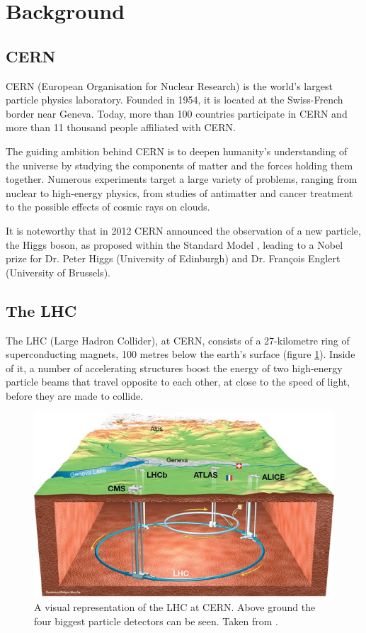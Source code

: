 \section{Background}
\subsection{CERN}
CERN (European Organisation for Nuclear Research) \cite{CERN_official} is the world's largest particle physics laboratory. Founded in 1954, it is located at the Swiss-French border near Geneva. Today, more than 100 countries participate in CERN and more than 11 thousand people affiliated with CERN.

The guiding ambition behind CERN is to deepen humanity's understanding of the universe by studying the components of matter and the forces holding them together. Numerous experiments target a large variety of problems, ranging from nuclear to high-energy physics, from studies of antimatter and cancer treatment to the possible effects of cosmic rays on clouds.

It is noteworthy that in 2012 CERN announced the observation of a new particle, the Higgs boson, as proposed within the Standard Model \cite{CERN_higgs}, leading to a Nobel prize for Dr. Peter Higgs (University of Edinburgh) and Dr. François Englert (University of Brussels). 

\subsection{The LHC}
The LHC (Large Hadron Collider), at CERN, consists of a 27-kilometre ring of superconducting magnets, 100 metres below the earth's surface (figure \ref{fig:LHC}). Inside of it, a number of accelerating structures boost the energy of two high-energy particle beams that travel opposite to each other, at close to the speed of light, before they are made to collide.  

\begin{figure}
    \centering
    \includegraphics[width=0.9\linewidth]{images/LHC.jpg}
        \caption{A visual representation of the LHC at CERN. Above ground the four biggest particle detectors can be seen. Taken from \cite{CERN_official}.}
    \label{fig:LHC}
\end{figure}

